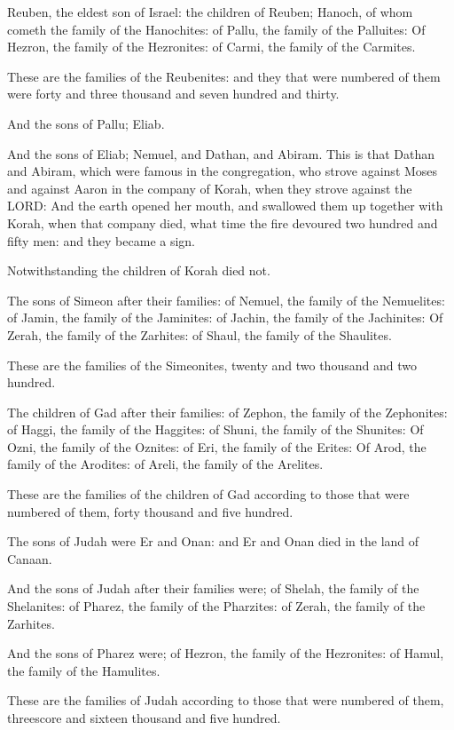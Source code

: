 \Verse Reuben, the eldest son of Israel: the children of Reuben; Hanoch,
of whom cometh the family of the Hanochites: of Pallu, the family of
the Palluites: \Verse Of Hezron, the family of the Hezronites: of Carmi,
the family of the Carmites.

\Verse These are the families of the Reubenites: and they that were
numbered of them were forty and three thousand and seven hundred and
thirty.

\Verse And the sons of Pallu; Eliab.

\Verse And the sons of Eliab; Nemuel, and Dathan, and Abiram. This is
that Dathan and Abiram, which were famous in the congregation, who
strove against Moses and against Aaron in the company of Korah, when
they strove against the LORD: \Verse And the earth opened her mouth,
and swallowed them up together with Korah, when that company died,
what time the fire devoured two hundred and fifty men: and they became
a sign.

\Verse Notwithstanding the children of Korah died not.

\Verse The sons of Simeon after their families: of Nemuel, the family
of the Nemuelites: of Jamin, the family of the Jaminites: of Jachin,
the family of the Jachinites: \Verse Of Zerah, the family of the
Zarhites: of Shaul, the family of the Shaulites.

\Verse These are the families of the Simeonites, twenty and two
thousand and two hundred.

\Verse The children of Gad after their families: of Zephon, the family
of the Zephonites: of Haggi, the family of the Haggites: of Shuni, the
family of the Shunites: \Verse Of Ozni, the family of the Oznites: of
Eri, the family of the Erites: \Verse Of Arod, the family of the
Arodites: of Areli, the family of the Arelites.

\Verse These are the families of the children of Gad according to those
that were numbered of them, forty thousand and five hundred.

\Verse The sons of Judah were Er and Onan: and Er and Onan died in the
land of Canaan.

\Verse And the sons of Judah after their families were; of Shelah, the
family of the Shelanites: of Pharez, the family of the Pharzites: of
Zerah, the family of the Zarhites.

\Verse And the sons of Pharez were; of Hezron, the family of the
Hezronites: of Hamul, the family of the Hamulites.

\Verse These are the families of Judah according to those that were
numbered of them, threescore and sixteen thousand and five hundred.

